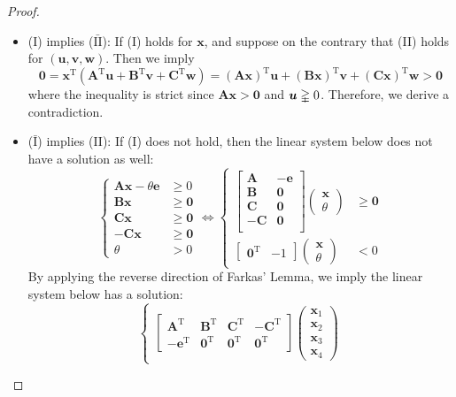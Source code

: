 \documentclass[12pt]{article}
\newcommand{\trans}{^{\mathrm T}}
\begin{document}
\begin{proof}
\begin{itemize}
\item
(I) implies ($\bar{\text{II}}$):
If (I) holds for $\bm x$, and suppose on the contrary that (II) holds for $(\bm u,\bm v,\bm w)$. Then we imply
\[
\bm0=\bm x\trans(\bm A\trans\bm u+\bm B\trans\bm v+\bm C\trans\bm w)
=
(\bm A\bm x)\trans\bm u+(\bm B\bm x)\trans\bm v+(\bm C\bm x)\trans\bm w>\bm0
\]
where the inequality is strict 
since $\bm A\bm x>\bm0$ and $\bm u\gvertneqq0$. Therefore, we derive a contradiction.
\item
($\bar{\text{I}}$) implies (II):
If (I) does not hold, then the linear system below does not have a solution as well:
\[
\left\{
\begin{aligned}
\bm A\bm x-\theta\bm e&\ge0\\
\bm B\bm x&\ge\bm0\\
\bm C\bm x&\ge\bm0\\
-\bm C\bm x&\ge\bm0\\
\theta&>0
\end{aligned}
\right.
\Longleftrightarrow
\left\{
\begin{aligned}
\begin{bmatrix}
\bm A&-\bm e\\
\bm B&\bm0\\
\bm C&\bm0\\
-\bm C&\bm0\\
\end{bmatrix}\begin{pmatrix}
\bm x\\\theta
\end{pmatrix}&\ge\bm0\\
\begin{bmatrix}
\bm0\trans&-1
\end{bmatrix}\begin{pmatrix}
\bm x\\\theta
\end{pmatrix}&<0
\end{aligned}
\right.
\]
By applying the reverse direction of Farkas' Lemma, we imply the linear system below has a solution:
\[
\left\{
\begin{aligned}
\begin{bmatrix}
\bm A\trans&\bm B\trans&\bm C\trans&-\bm C\trans\\
-\bm e\trans&\bm0\trans&\bm0\trans&\bm0\trans
\end{bmatrix}\begin{pmatrix}
\bm x_1\\\bm x_2\\\bm x_3\\\bm x_4

\end{pmatrix}
\end{aligned}\]
\end{itemize}
\end{proof}
\end{document}
